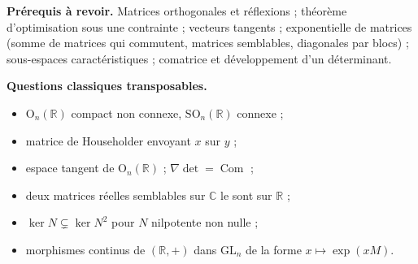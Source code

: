 \documentclass[11pt,a4paper]{article}
\providecommand{\tightlist}{\setlength{\itemsep}{0pt}\setlength{\parskip}{0pt}}
\begin{document}
\textbf{Prérequis à revoir.} Matrices orthogonales et réflexions ; théorème d'optimisation sous une contrainte ; vecteurs tangents ; exponentielle de matrices (somme de matrices qui commutent, matrices semblables, diagonales par blocs) ; sous-espaces caractéristiques ; comatrice et développement d'un déterminant.

\textbf{Questions classiques transposables.}

\begin{itemize}
\tightlist
\item
  \({\mathrm{O}}_n(\mathbb{R})\) compact non connexe, \({\mathrm{SO}}_n(\mathbb{R})\) connexe ;
\item
  matrice de Householder envoyant \(x\) sur \(y\) ;
\item
  espace tangent de \({\mathrm{O}}_n(\mathbb{R})\) ; \(\nabla\det=\operatorname{Com}\) ;
\item
  deux matrices réelles semblables sur \(\mathbb{C}\) le sont sur \(\mathbb{R}\) ;
\item
  \(\ker N\subsetneq\ker N^2\) pour \(N\) nilpotente non nulle ;
\item
  morphismes continus de \((\mathbb{R},+)\) dans \({\mathrm{GL}}_n\) de la forme \(x\mapsto\exp(xM)\).
\end{itemize}
\end{document}

